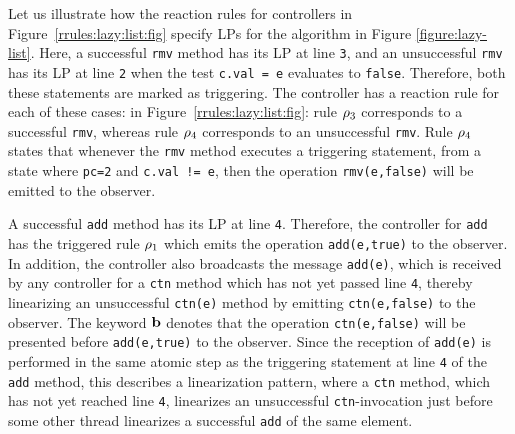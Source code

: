 Let us  illustrate how the reaction rules for controllers in
Figure~\ref{rrules:lazy:list:fig} specify LPs
for the algorithm in Figure \ref{figure:lazy-list}.
Here, a successful {\tt rmv} method has its LP at
line {\tt 3}, and
an unsuccessful {\tt rmv} has its LP at line {\tt 2} when the test
{\tt c.val = e} evaluates to {\tt false}.
Therefore, both these statements are marked as triggering.
The controller has a reaction rule for each of these cases: in
Figure~\ref{rrules:lazy:list:fig}:
rule $\rho_3$ corresponds to a successful {\tt rmv},
whereas
rule $\rho_4$ corresponds to an unsuccessful {\tt rmv}.
Rule $\rho_4$ states that whenever the {\tt rmv}
method executes a
triggering statement, from a state where {\tt pc=2} and {\tt c.val != e}, then
the operation {\tt rmv(e,false)} will be emitted to the observer.

A successful {\tt add} method has its LP at line {\tt 4}. Therefore, the
controller for {\tt add} has the triggered rule $\rho_1$ which emits
the operation {\tt add(e,true)} to the observer. In addition, the
controller
also broadcasts the message {\tt add(e)}, which is
received by any controller for a {\tt ctn} method which has not yet
passed line {\tt 4}, thereby
linearizing an unsuccessful {\tt ctn(e)} method by
emitting {\tt ctn(e,false)} to the observer.
  The keyword ${\bf b}$ denotes that the operation
  {\tt ctn(e,false)} will be presented before {\tt add(e,true)} to the observer.
Since the reception of {\tt add(e)} is performed in the same atomic step as the
triggering statement at line {\tt 4} of the {\tt add} method, this
describes a linearization pattern, where
a {\tt ctn} method, which has not yet reached line {\tt 4}, linearizes an
unsuccessful {\tt ctn}-invocation just before some other thread linearizes
a successful {\tt add} of the same element. 


 



